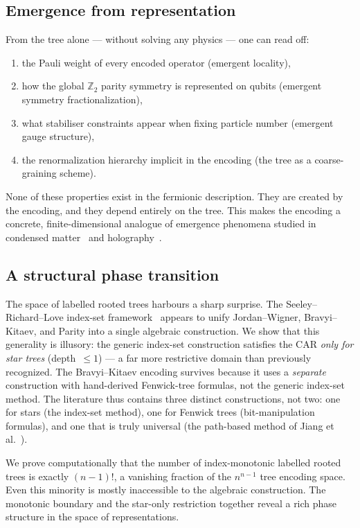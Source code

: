 \subsection*{Emergence from representation}

From the tree alone — without solving any physics — one can read off:
\begin{enumerate}
  \item the Pauli weight of every encoded operator (emergent locality),
  \item how the global $\mathbb{Z}_2$ parity symmetry is represented on
        qubits (emergent symmetry fractionalization),
  \item what stabiliser constraints appear when fixing particle number
        (emergent gauge structure),
  \item the renormalization hierarchy implicit in the encoding
        (the tree as a coarse-graining scheme).
\end{enumerate}
None of these properties exist in the fermionic description.  They are
created by the encoding, and they depend entirely on the tree.  This
makes the encoding a concrete, finite-dimensional analogue of emergence
phenomena studied in condensed matter~\cite{anderson1972more,wen2017zoo}
and holography~\cite{swingle2012,pastawski2015happy}.

\subsection*{A structural phase transition}

The space of labelled rooted trees harbours a sharp surprise.  The
Seeley--Richard--Love index-set framework~\cite{seeley2012} appears to
unify Jordan--Wigner, Bravyi--Kitaev, and Parity into a single
algebraic construction.  We show that this generality is illusory: the
generic index-set construction satisfies the CAR \emph{only for star
trees} (depth~$\le 1$) --- a far more restrictive domain than
previously recognized.  The Bravyi--Kitaev encoding survives because
it uses a \emph{separate} construction with hand-derived Fenwick-tree
formulas, not the generic index-set method.  The literature thus
contains three distinct constructions, not two: one for stars (the
index-set method), one for Fenwick trees (bit-manipulation formulas),
and one that is truly universal (the path-based method of Jiang et
al.~\cite{jiang2020}).

We prove computationally that the number of index-monotonic labelled
rooted trees is exactly $(n{-}1)!$, a vanishing fraction of the
$n^{n-1}$ tree encoding space.  Even this minority is mostly
inaccessible to the algebraic construction.  The monotonic boundary
and the star-only restriction together reveal a rich phase structure in
the space of representations.

